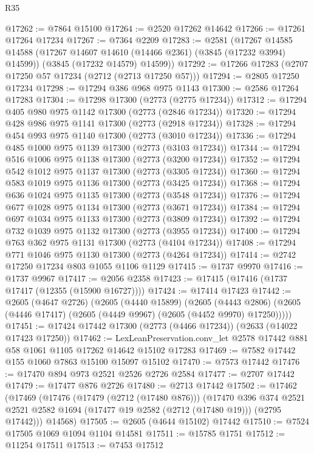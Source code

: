 \begin{lexlean}{R35}
\begin{coremodule}
@17262 := @7864 @15100
@17264 := @2520 @17262 @14642
@17266 := @17261 @17264 @17234
@17267 := @7364 @2209
@17283 := @2581
    (@17267
      @14585
      @14588
      (@17267 @14607 @14610 (@14466 @2361) (@3845 (@17232 @3994) @14599))
      (@3845 (@17232 @14579) @14599))
@17292 := @17266 @17283 (@2707 @17250 @57 @17234 (@2712 (@2713 @17250 @57)))
@17294 := @2805 @17250 @17234
@17298 := @17294 @386 @968 @975 @1143
@17300 := @2586 @17264 @17283
@17304 := @17298 @17300 (@2773 (@2775 @17234))
@17312 := @17294 @405 @980 @975 @1142 @17300 (@2773 (@2846 @17234))
@17320 := @17294 @428 @986 @975 @1141 @17300 (@2773 (@2918 @17234))
@17328 := @17294 @454 @993 @975 @1140 @17300 (@2773 (@3010 @17234))
@17336 := @17294 @485 @1000 @975 @1139 @17300 (@2773 (@3103 @17234))
@17344 := @17294 @516 @1006 @975 @1138 @17300 (@2773 (@3200 @17234))
@17352 := @17294 @542 @1012 @975 @1137 @17300 (@2773 (@3305 @17234))
@17360 := @17294 @583 @1019 @975 @1136 @17300 (@2773 (@3425 @17234))
@17368 := @17294 @636 @1024 @975 @1135 @17300 (@2773 (@3548 @17234))
@17376 := @17294 @677 @1028 @975 @1134 @17300 (@2773 (@3671 @17234))
@17384 := @17294 @697 @1034 @975 @1133 @17300 (@2773 (@3809 @17234))
@17392 := @17294 @732 @1039 @975 @1132 @17300 (@2773 (@3955 @17234))
@17400 := @17294 @763 @362 @975 @1131 @17300 (@2773 (@4104 @17234))
@17408 := @17294 @771 @1046 @975 @1130 @17300 (@2773 (@4264 @17234))
@17414 := @2742 @17250 @17234 @803 @1055 @1106 @1129
@17415 := @1737 @9970
@17416 := @1737 @9967
@17417 := @2056 @2358
@17423 := @17415 (@17416 (@1737 @17417 (@12355 (@15900 @16727))))
@17424 := @17414 @17423
@17442 := @2605
    (@4647 @2726)
    (@2605
      (@4440 @15899)
      (@2605
        (@4443 @2806)
        (@2605 (@4446 @17417) (@2605 (@4449 @9967) (@2605 (@4452 @9970) @17250)))))
@17451 := @17424 @17442 @17300 (@2773 (@4466 @17234)) (@2633 (@14022 @17423 @17250))
@17462 := LexLeanPreservation.conv_let @2578 @17442 @881 @58 @1061 @1105 @17262 @14642 @15102 @17283
@17469 := @7582 @17442 @155 @1060 @7863 @15100 @15097 @15102
@17470 := @7573 @17442
@17476 := @17470 @894 @973 @2521 @2526 @2726 @2584
@17477 := @2707 @17442
@17479 := @17477 @876 @2726
@17480 := @2713 @17442
@17502 := @17462
    (@17469
      (@17476
        (@17479 (@2712 (@17480 @876)))
        (@17470
          @396
          @374
          @2521
          @2521
          @2582
          @1694
          (@17477 @19 @2582 (@2712 (@17480 @19)))
          (@2795 @17442)))
      @14568)
@17505 := @2605 (@4644 @15102) @17442
@17510 := @7524 @17505 @1069 @1094 @1104 @14581
@17511 := @15785 @1751
@17512 := @11254 @17511
@17513 := @7453 @17512

\end{coremodule}
\end{lexlean}
